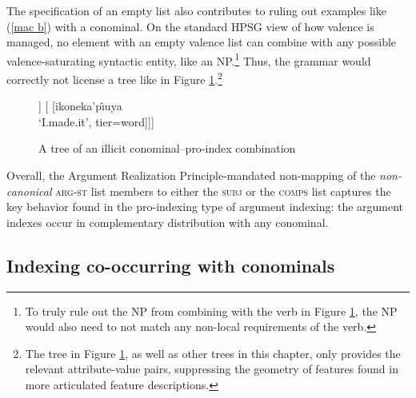 \documentclass[output=paper
	        ,collection
	        ,collectionchapter
 	        ,biblatex
                ,babelshorthands
                ,newtxmath
                ,draftmode
                ,colorlinks, citecolor=brown
]{langscibook}
\begin{document}
The specification of an empty list also contributes to ruling out examples like (\ref{mac b}) with a conominal. On the standard HPSG view of how valence is managed, no element with an empty valence list can combine with any possible valence-saturating syntactic entity, like an NP.\footnote{To truly rule out the NP from combining with the verb in Figure \ref{no conominal}, the NP would also need to not match any non-local requirements of the verb. } Thus, the grammar would correctly not license a tree like in Figure \ref{no conominal}.\footnote{The tree in Figure \ref{no conominal}, as well as other trees in this chapter, only provides the relevant attribute-value pairs, suppressing the geometry of features found in more articulated feature descriptions.}
%
\begin{figure}[htp]
\centering
\begin{forest}
[* 
	[NP[uur\^{\i}ya \\ `me.\textsc{erg}' ,tier=word,roof]] 
	[ 
[ikoneka'p\^{\i}uya \\ `I.made.it', tier=word]]]
\end{forest}
\caption{A tree of an illicit conominal--pro-index combination}
\label{no conominal}
\end{figure}

Overall, the Argument Realization Principle-mandated non-mapping of the \textit{non-canonical} \textsc{arg-st} list members to either the \textsc{subj} or the \textsc{comps} list captures the key behavior found in the pro-indexing type of argument indexing: the argument indexes occur in complementary distribution with any conominal.    
 
\subsection{Indexing co-occurring with conominals} 
\end{document}
